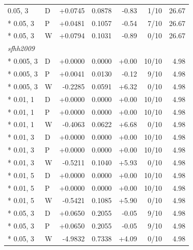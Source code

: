 \begin{longtable}{llrrrrr}
0.05, 3 & D & +0.0745 & 0.0878 & -0.83 & 1/10 & 26.67\\*
0.05, 3 & P & +0.0481 & 0.1057 & -0.54 & 7/10 & 26.67\\*
0.05, 3 & W & +0.0794 & 0.1031 & -0.89 & 0/10 & 26.67\\
\multicolumn{7}{l}{\textit{sfhh2009}}\\*
0.005, 3 & D & +0.0000 & 0.0000 & +0.00 & 10/10 & 4.98\\*
0.005, 3 & P & +0.0041 & 0.0130 & -0.12 & 9/10 & 4.98\\*
0.005, 3 & W & -0.2285 & 0.0591 & +6.32 & 0/10 & 4.98\\*
0.01, 1 & D & +0.0000 & 0.0000 & +0.00 & 10/10 & 4.98\\*
0.01, 1 & P & +0.0000 & 0.0000 & +0.00 & 10/10 & 4.98\\*
0.01, 1 & W & -0.4063 & 0.0622 & +6.68 & 0/10 & 4.98\\*
0.01, 3 & D & +0.0000 & 0.0000 & +0.00 & 10/10 & 4.98\\*
0.01, 3 & P & +0.0000 & 0.0000 & +0.00 & 10/10 & 4.98\\*
0.01, 3 & W & -0.5211 & 0.1040 & +5.93 & 0/10 & 4.98\\*
0.01, 5 & D & +0.0000 & 0.0000 & +0.00 & 10/10 & 4.98\\*
0.01, 5 & P & +0.0000 & 0.0000 & +0.00 & 10/10 & 4.98\\*
0.01, 5 & W & -0.5421 & 0.1085 & +5.90 & 0/10 & 4.98\\*
0.05, 3 & D & +0.0650 & 0.2055 & -0.05 & 9/10 & 4.98\\*
0.05, 3 & P & +0.0650 & 0.2055 & -0.05 & 9/10 & 4.98\\*
0.05, 3 & W & -4.9832 & 0.7338 & +4.09 & 0/10 & 4.98\\
\end{longtable}
